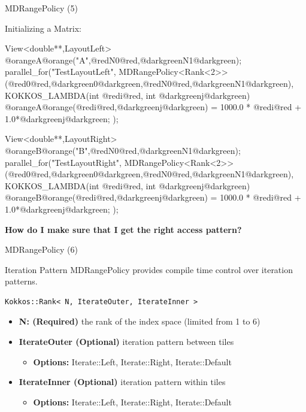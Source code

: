 \begin{frame}[fragile]{MDRangePolicy (5)}

  Initializing a Matrix:

\begin{code}[keywords={LayoutLeft}]
View<double**,LayoutLeft> @orangeA@orange("A",@redN0@red,@darkgreenN1@darkgreen);
parallel_for("TestLayoutLeft",
  MDRangePolicy<Rank<2>>({@red0@red,@darkgreen0@darkgreen},{@redN0@red,@darkgreenN1@darkgreen}),
  KOKKOS_LAMBDA(int @redi@red, int @darkgreenj@darkgreen) {
    @orangeA@orange(@redi@red,@darkgreenj@darkgreen) = 1000.0 * @redi@red + 1.0*@darkgreenj@darkgreen;
});
\end{code}

\begin{code}[keywords={LayoutRight}]
View<double**,LayoutRight> @orangeB@orange("B",@redN0@red,@darkgreenN1@darkgreen);
parallel_for("TestLayoutRight",
  MDRangePolicy<Rank<2>>({@red0@red,@darkgreen0@darkgreen},{@redN0@red,@darkgreenN1@darkgreen}),
  KOKKOS_LAMBDA(int @redi@red, int @darkgreenj@darkgreen) {
    @orangeB@orange(@redi@red,@darkgreenj@darkgreen) = 1000.0 * @redi@red + 1.0*@darkgreenj@darkgreen;
});
\end{code}

\pause

	\textbf{How do I make sure that I get the right access pattern?}

\end{frame}


\begin{frame}[fragile]{MDRangePolicy (6)}
\begin{block}{Iteration Pattern}
MDRangePolicy provides compile time control over iteration patterns.
\end{block}

  \begin{lstlisting}[basicstyle=\large,gobble=4]
    Kokkos::Rank< N, IterateOuter, IterateInner >
  \end{lstlisting}

  \begin{itemize}
    \item{\small{\textbf{N: (Required)} the rank of the index space (limited from 1 to 6)}}
    \item{\small{\textbf{IterateOuter (Optional)} iteration pattern between tiles}}
    \begin{itemize}
      \item{\small{\textbf{Options:} Iterate::Left, Iterate::Right, Iterate::Default}}
    \end{itemize}
    \item{\small{\textbf{IterateInner (Optional)} iteration pattern within tiles}}
    \begin{itemize}
      \item{\small{\textbf{Options:} Iterate::Left, Iterate::Right, Iterate::Default}}
    \end{itemize}
  \end{itemize}
\end{frame}

